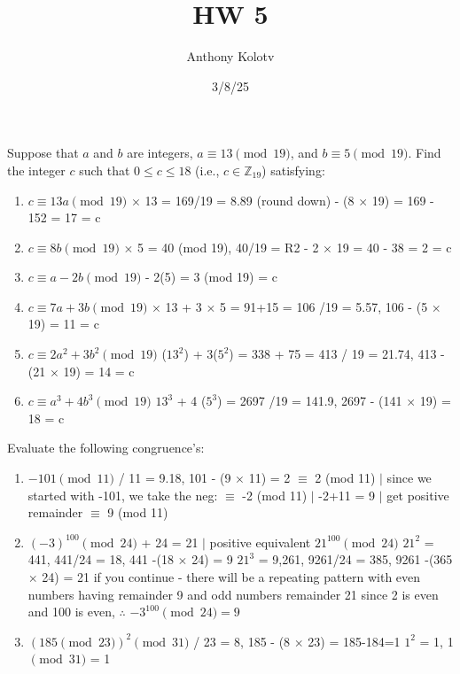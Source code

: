 \documentclass{article}
\title{HW 5}
\date{3/8/25}
\author{Anthony Kolotv}
\begin{document}
	
	\maketitle


	Suppose that $a$ and $b$ are integers, $a \equiv 13 \pmod{19}$, and $b \equiv 5 \pmod{19}$. Find the integer $c$ such that $0 \leq c \leq 18$ (i.e., $c \in \mathbb{Z}_{19}$) satisfying:
	\begin{enumerate}
		\item $c \equiv 13a \pmod{19}$
		 $\times$ 13 = 169/19 = 8.89 (round down)
		 - (8 $\times$ 19) = 169 - 152 = 17 = c
		\item $c \equiv 8b \pmod{19}$ 
		 $\times$ 5 = 40 (mod 19), 40/19 = R2
		 - 2 $\times$ 19 = 40 - 38 = 2 = c
		\item $c \equiv a - 2b \pmod{19}$
		 - 2(5) = 3 (mod 19) = c
		\item $c \equiv 7a + 3b \pmod{19}$
		 $\times$ 13 + 3 $\times$ 5 = 91+15 = 106 
		/19 = 5.57, 106 - (5 $\times$ 19) = 11 = c
		\item $c \equiv 2a^2 + 3b^2 \pmod{19}$
		($13^2$) + 3($5^2$) = 338 + 75 = 413 
		 / 19 = 21.74, 413 - (21 $\times$ 19) = 14 = c
		\item $c \equiv a^3 + 4b^3 \pmod{19}$
		\subitem $13^3$ + 4 ($5^3$) = 2697
		/19 = 141.9, 2697 - (141 $\times$ 19) = 18 = c
	\end{enumerate}
	

	Evaluate the following congruence's:
	\begin{enumerate}
		\item $-101 \pmod{11}$
		 / 11 = 9.18, 101 - (9 $\times$ 11) = 2
		 $\equiv$ 2 (mod 11) $|$ since we started with -101, we take the neg:
		 $\equiv$ -2 (mod 11) $|$ -2+11 = 9 $|$ get positive remainder
		 $\equiv$ 9 (mod 11)
		\item $(-3)^{100} \pmod{24}$
		 + 24 = 21 $|$ positive equivalent 
		\subitem $21^{100} \pmod{24}$
		\subitem $21^2$ = 441, 441/24 = 18, 441 -(18 $\times$ 24) = 9
		\subitem $21^3$ = 9,261, 9261/24 = 385, 9261 -(365 $\times$ 24) = 21
		\subitem  if you continue - there will be  a repeating pattern with even numbers having remainder 9 and odd numbers remainder 21 
		\subitem since 2 is even and 100 is even, $\therefore$ $-3^{100} \pmod{24} = 9 $ 
		\item $(185 \pmod{23})^2 \pmod{31}$
		 / 23 = 8, 185 - (8 $\times$ 23) = 185-184=1
		\subitem $1^2$ = 1, 1 $\pmod{31}$ = 1
	\end{enumerate}
	
\end{document}
